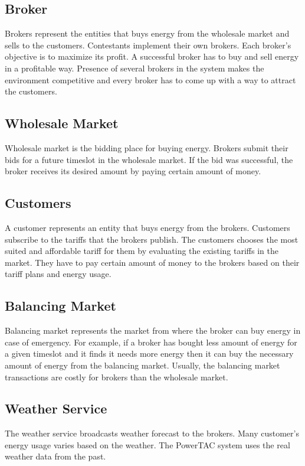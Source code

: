 \subsection{Broker}
Brokers represent the entities that buys energy from the wholesale market and sells to the customers. Contestants implement their own brokers. Each broker's objective is to maximize its profit. A successful broker has to buy and sell energy in a profitable way. Presence of several brokers in the system makes the environment competitive and every broker has to come up with a way to attract the customers. 

\subsection{Wholesale Market}
Wholesale market is the bidding place for buying energy. Brokers submit their bids for a future timeslot in the wholesale market. If the bid was successful, the broker receives its desired amount by paying certain amount of money. 

\subsection{Customers}
A customer represents an entity that buys energy from the brokers. Customers subscribe to the tariffs that the brokers publish. The customers chooses the most suited and affordable tariff for them by evaluating the existing tariffs in the market. They have to pay certain amount of money to the brokers based on their tariff plans and energy usage.

\subsection{Balancing Market}
Balancing market represents the market from where the broker can buy energy in case of emergency. For example, if a broker has bought less amount of energy for a given timeslot and it finds it needs more energy then it can buy the necessary amount of energy from the balancing market. Usually, the balancing market transactions are costly for brokers than the wholesale market.

\subsection{Weather Service}
The weather service broadcasts weather forecast to the brokers. Many customer's energy usage varies based on the weather. The PowerTAC system uses the real weather data from the past.

